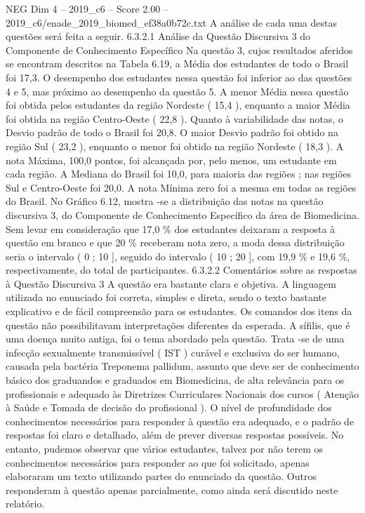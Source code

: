 \begin{textsample}{NEG Dim 4 – 2019\_c6 – Score 2.00 – 2019\_c6/enade\_2019\_biomed\_ef38a0b72c.txt}
A análise de cada uma destas questões será feita a seguir. 6.3.2.1 Análise da Questão Discursiva 3 do Componente de Conhecimento Específico Na questão 3, cujos resultados aferidos se encontram descritos na Tabela 6.19, a Média dos estudantes de todo o Brasil foi 17,3.
O desempenho dos estudantes nessa questão foi inferior ao das questões 4 e 5, mas próximo ao desempenho da questão 5.
A menor Média nessa questão foi obtida pelos estudantes da região Nordeste ( 15,4 ), enquanto a maior Média foi obtida na região Centro-Oeste ( 22,8 ).
Quanto à variabilidade das notas, o Desvio padrão de todo o Brasil foi 20,8.
O maior Desvio padrão foi obtido na região Sul ( 23,2 ), enquanto o menor foi obtido na região Nordeste ( 18,3 ).
A nota Máxima, 100,0 pontos, foi alcançada por, pelo menos, um estudante em cada região.
A Mediana do Brasil foi 10,0, para maioria das regiões ; nas regiões Sul e Centro-Oeste foi 20,0.
A nota Mínima zero foi a mesma em todas as regiões do Brasil.
No Gráfico 6.12, mostra -se a distribuição das notas na questão discursiva 3, do Componente de Conhecimento Específico da área de Biomedicina.
Sem levar em consideração que 17,0 \% dos estudantes deixaram a resposta à questão em branco e que 20 \% receberam nota zero, a moda dessa distribuição seria o intervalo ( 0 ; 10 ], seguido do intervalo ( 10 ; 20 ], com 19,9 \% e 19,6 \%, respectivamente, do total de participantes. 6.3.2.2 Comentários sobre as respostas à Questão Discursiva 3 A questão era bastante clara e objetiva.
A linguagem utilizada no enunciado foi correta, simples e direta, sendo o texto bastante explicativo e de fácil compreensão para os estudantes.
Os comandos dos itens da questão não possibilitavam interpretações diferentes da esperada.
A sífilis, que é uma doença muito antiga, foi o tema abordado pela questão.
Trata -se de uma infecção sexualmente transmissível ( IST ) curável e exclusiva do ser humano, causada pela bactéria Treponema pallidum, assunto que deve ser de conhecimento básico dos graduandos e graduados em Biomedicina, de alta relevância para os profissionais e adequado às Diretrizes Curriculares Nacionais dos cursos ( Atenção à Saúde e Tomada de decisão do profissional ).
O nível de profundidade dos conhecimentos necessários para responder à questão era adequado, e o padrão de respostas foi claro e detalhado, além de prever diversas respostas possíveis.
No entanto, pudemos observar que vários estudantes, talvez por não terem os conhecimentos necessários para responder ao que foi solicitado, apenas elaboraram um texto utilizando partes do enunciado da questão.
Outros responderam à questão apenas parcialmente, como ainda será discutido neste relatório.

\end{textsample}
